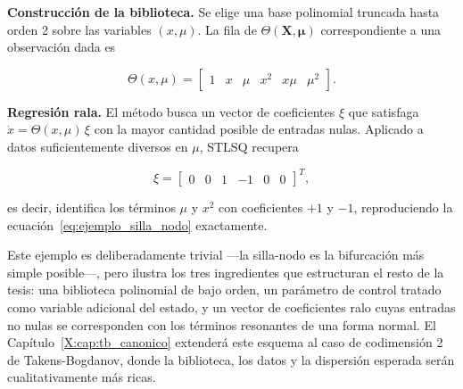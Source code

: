 \textbf{Construcción de la biblioteca.} Se elige una base polinomial truncada hasta orden 2 sobre las variables $(x, \mu)$. La fila de $\Theta(\mathbf{X}, \boldsymbol{\mu})$ correspondiente a una observación dada es

\begin{equation}
\Theta(x, \mu) = \begin{bmatrix} 1 & x & \mu & x^2 & x\mu & \mu^2 \end{bmatrix}.
\tag{2.5}
\label{eq:theta_ejemplo_1d}
\end{equation}

\textbf{Regresión rala.} El método busca un vector de coeficientes $\xi$ que satisfaga $\dot{x} = \Theta(x, \mu)\,\xi$ con la mayor cantidad posible de entradas nulas. Aplicado a datos suficientemente diversos en $\mu$, STLSQ recupera

\begin{equation}
\xi = \begin{bmatrix} 0 & 0 & 1 & -1 & 0 & 0 \end{bmatrix}^T,
\tag{2.6}
\label{eq:xi_ejemplo_1d}
\end{equation}

es decir, identifica los términos $\mu$ y $x^2$ con coeficientes $+1$ y $-1$, reproduciendo la ecuación~\eqref{eq:ejemplo_silla_nodo} exactamente.

Este ejemplo es deliberadamente trivial —la silla-nodo es la bifurcación más simple posible—, pero ilustra los tres ingredientes que estructuran el resto de la tesis: una biblioteca polinomial de bajo orden, un parámetro de control tratado como variable adicional del estado, y un vector de coeficientes ralo cuyas entradas no nulas se corresponden con los términos resonantes de una forma normal. El Capítulo~\ref{X:cap:tb_canonico} extenderá este esquema al caso de codimensión 2 de Takens-Bogdanov, donde la biblioteca, los datos y la dispersión esperada serán cualitativamente más ricas.

\clearpage
